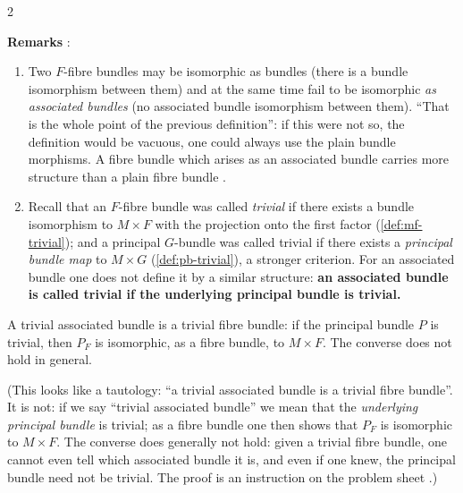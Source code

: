 \begin{paracol}{2}
\begin{coursenote}
\end{coursenote}
\textbf{Remarks} :
\begin{enumerate}
  \item[1.] Two $F$-fibre bundles may be isomorphic as bundles (there is a bundle isomorphism between them) and at the same time fail to be isomorphic \emph{as associated bundles} (no associated bundle isomorphism between them). ``That is the whole point of the previous definition'': if this were not so, the definition would be vacuous, one could always use the plain bundle morphisms. A fibre bundle which arises as an associated bundle carries more structure than a plain fibre bundle       .
  \item[2.] Recall that an $F$-fibre bundle was called \emph{trivial} if there exists a bundle isomorphism to $M\times F$ with the projection onto the first factor (\cref{def:mf-trivial}); and a principal $G$-bundle was called trivial if there exists a \emph{principal bundle map} to $M\times G$ (\cref{def:pb-trivial}), a stronger criterion. For an associated bundle one does not define it by a similar structure: \textbf{an associated bundle is called trivial if the underlying principal bundle is trivial.}          
\end{enumerate}
\begin{theorem}\label{thm:ab-trivial}
A trivial associated bundle is a trivial fibre bundle: if the principal bundle $P$ is trivial, then $P_F$ is isomorphic, as a fibre bundle, to $M\times F$. The converse does not hold in general.     
\end{theorem}
(This looks like a tautology: ``a trivial associated bundle is a trivial fibre bundle''. It is not: if we say ``trivial associated bundle'' we mean that the \emph{underlying principal bundle} is trivial; as a fibre bundle one then shows that $P_F$ is isomorphic to $M\times F$. The converse does generally not hold: given a trivial fibre bundle, one cannot even tell which associated bundle it is, and even if one knew, the principal bundle need not be trivial. The proof is an instruction on the problem sheet    .)

\end{paracol}
